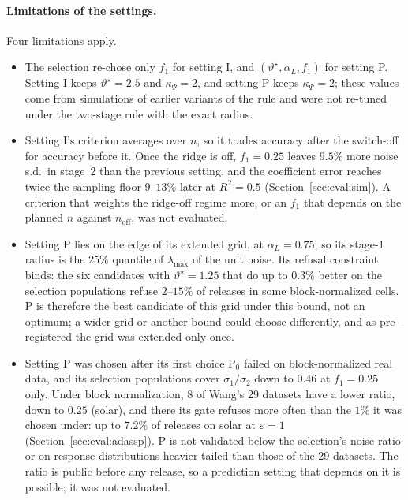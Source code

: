 \documentclass[11pt]{article}
\theoremstyle{definition}
\theoremstyle{plain}
\begin{document}
\paragraph{Limitations of the settings.} Four limitations apply.
\begin{itemize}[noitemsep]
  \item The selection re-chose only $f_1$ for setting I, and $(\vartheta^\star, \alpha_L, f_1)$ for setting P. Setting I keeps $\vartheta^\star = 2.5$ and $\kappa_\Psi = 2$, and setting P keeps $\kappa_\Psi = 2$; these values come from simulations of earlier variants of the rule and were not re-tuned under the two-stage rule with the exact radius.
  \item Setting I's criterion averages over $n$, so it trades accuracy after the switch-off for accuracy before it. Once the ridge is off, $f_1 = 0.25$ leaves $9.5\%$ more noise s.d.\ in stage~2 than the previous setting, and the coefficient error reaches twice the sampling floor $9$--$13\%$ later at $R^2 = 0.5$ (Section~\ref{sec:eval:sim}). A criterion that weights the ridge-off regime more, or an $f_1$ that depends on the planned $n$ against $n_{\mathrm{off}}$, was not evaluated.
  \item Setting P lies on the edge of its extended grid, at $\alpha_L = 0.75$, so its stage-1 radius is the $25\%$ quantile of $\lambda_{\max}$ of the unit noise. Its refusal constraint binds: the six candidates with $\vartheta^\star = 1.25$ that do up to $0.3\%$ better on the selection populations refuse $2$--$15\%$ of releases in some block-normalized cells. P is therefore the best candidate of this grid under this bound, not an optimum; a wider grid or another bound could choose differently, and as pre-registered the grid was extended only once.
  \item Setting P was chosen after its first choice P$_0$ failed on block-normalized real data, and its selection populations cover $\sigma_1/\sigma_2$ down to $0.46$ at $f_1 = 0.25$ only. Under block normalization, 8 of Wang's 29 datasets have a lower ratio, down to $0.25$ (solar), and there its gate refuses more often than the $1\%$ it was chosen under: up to $7.2\%$ of releases on solar at $\varepsilon = 1$ (Section~\ref{sec:eval:adassp}). P is not validated below the selection's noise ratio or on response distributions heavier-tailed than those of the 29 datasets. The ratio is public before any release, so a prediction setting that depends on it is possible; it was not evaluated.
\end{itemize}
\end{document}
